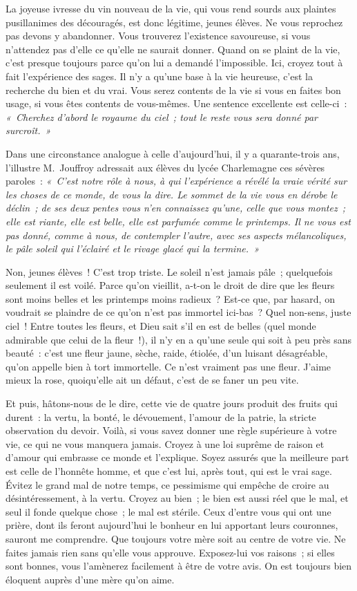 \documentclass[french,twoside]{book} %
\newcommand\orgName[1]{#1}
\newcommand\persName[1]{#1}
\begin{document}
La joyeuse ivresse du vin nouveau de la vie, qui vous rend sourds aux plaintes pusillanimes des découragés, est donc légitime, jeunes élèves. Ne vous reprochez pas devons y abandonner. Vous trouverez l’existence savoureuse, si vous n’attendez pas d’elle ce qu’elle ne saurait donner. Quand on se plaint de la vie, c’est presque toujours parce qu’on lui a demandé l’impossible. Ici, croyez tout à fait l’expérience des sages. Il n’y a qu’une base à la vie heureuse, c’est la recherche du bien et du vrai. Vous serez contents de la vie si vous en faites bon usage, si vous êtes contents de vous-mêmes. Une sentence excellente est celle-ci : \emph{« Cherchez d’abord le royaume du ciel ; tout le reste vous sera donné par surcroît. »}\par
Dans une circonstance analogue à celle d’aujourd’hui, il y a quarante-trois ans, l’illustre {\persName M. Jouffroy} adressait aux élèves du {\orgName lycée Charlemagne} ces sévères paroles : \emph{« C’est notre rôle à nous, à qui l’expérience a révélé la vraie vérité sur les choses de ce monde, de vous la dire. Le sommet de la vie vous en dérobe le déclin ; de ses deux pentes vous n’en connaissez qu’une, celle que vous montez ; elle est riante, elle est belle, elle est parfumée comme le printemps. Il ne vous est pas donné, comme à nous, de contempler l’autre, avec ses aspects mélancoliques, le pâle soleil qui l’éclairé et le rivage glacé qui la termine. »}\par
Non, jeunes élèves ! C’est trop triste. Le soleil n’est jamais pâle ; quelquefois seulement il est voilé. Parce qu’on vieillit, a-t-on le droit de dire que les fleurs sont moins belles et les printemps moins radieux ? Est-ce que, par hasard, on voudrait se plaindre de ce qu’on n’est pas immortel ici-bas ? Quel non-sens, juste ciel ! Entre toutes les fleurs, et Dieu sait s’il en est de belles (quel monde admirable que celui de la fleur !), il n’y en a qu’une seule qui soit à peu près sans beauté : c’est une fleur jaune, sèche, raide, étiolée, d’un luisant désagréable, qu’on appelle bien à tort immortelle. Ce n’est vraiment pas une fleur. J’aime mieux la rose, quoiqu’elle ait un défaut, c’est de se faner un peu vite.\par
Et puis, hâtons-nous de le dire, cette vie de quatre jours produit des fruits qui durent : la vertu, la bonté, le dévouement, l’amour de la patrie, la stricte observation du devoir. Voilà, si vous savez donner une règle supérieure à votre vie, ce qui ne vous manquera jamais. Croyez à une loi suprême de raison et d’amour qui embrasse ce monde et l’explique. Soyez assurés que la meilleure part est celle de l’honnête homme, et que c’est lui, après tout, qui est le vrai sage. Évitez le grand mal de notre temps, ce pessimisme qui empêche de croire au désintéressement, à la vertu. Croyez au bien ; le bien est aussi réel que le mal, et seul il fonde quelque chose ; le mal est stérile. Ceux d’entre vous qui ont une prière, dont ils feront aujourd’hui le bonheur en lui apportant leurs couronnes, sauront me comprendre. Que toujours votre mère soit au centre de votre vie. Ne faites jamais rien sans qu’elle vous approuve. Exposez-lui vos raisons ; si elles sont bonnes, vous l’amènerez facilement à être de votre avis. On est toujours bien éloquent auprès d’une mère qu’on aime.\par
\end{document}
